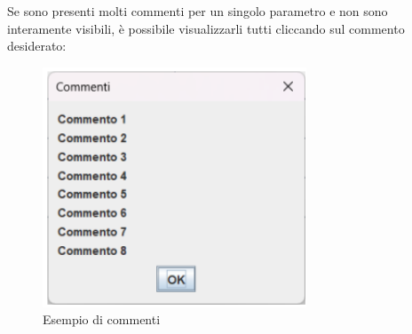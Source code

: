 Se sono presenti molti commenti per un singolo parametro e non sono interamente visibili, è possibile visualizzarli tutti cliccando sul commento desiderato:
\begin{figure}[H]
    \centering
    \includegraphics[width=0.7\textwidth]{../../img/esempio_commenti.png}
    \caption{Esempio di commenti}
\end{figure}